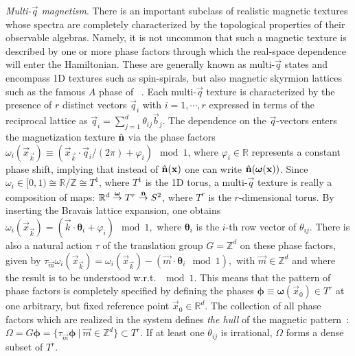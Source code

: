 \documentclass[
    10pt,
    aps,
    prr,
    twocolumn,
    floatfix,
    superscriptaddress
]{revtex4-2}
\newcommand{\revise}[1]{{\color{red} #1}}
\begin{document}
\revise{{\it Multi-$\vec{q}$ magnetism}}. There is an important subclass of realistic magnetic textures whose spectra are completely characterized by the topological properties of their observable algebras.
Namely, it is not uncommon that such a magnetic texture is described by one or more phase factors through which the real-space dependence will enter the Hamiltonian. 
These are generally known as multi-$\vec{q}$ states and encompass 1D textures such as spin-spirals, but also magnetic skyrmion lattices such as the famous $A$ phase of ~\cite{Neubauer2009}.
Each multi-$\vec{q}$ texture is characterized by
the presence of $r$ distinct vectors $\vec{q}_i$ with $i=1,\cdots,r$ expressed in terms of the reciprocal lattice as $\vec{q}_i = \sum_{j=1}^d \theta_{ij} \vec{b}_j$.
The dependence on the $\vec{q}$-vectors enters the magnetization texture $\hat{\mathbf{n}}$ via the
phase factors 
$
    \omega_i (\vec{x}_\vec{k}) \equiv  (\vec{x}_\vec{k}  \cdot \vec{q}_i/ (2\pi) + \varphi_i) \mod 1 
$, where $\varphi_i \in \mathbb{R}$ represents a constant phase shift, implying that instead of $\hat{\mathbf{n}}(\mathbf{x})$  one can write $\hat{\mathbf{n}}( \boldsymbol{\omega} (\mathbf{x}) )$.
Since $\omega_i \in [0,1) \cong \mathbb{R}/ \mathbb{Z} \cong T^1$, where $T^1$ is the 1D torus, a multi-$\vec{q}$ texture is really a composition of maps: $\mathbb{R}^d \overset{\boldsymbol{\omega}}{\rightarrow} T^r
     \overset{\hat{\mathbf{n}}}{\rightarrow} S^2 $, where $T^r$ is the $r$-dimensional torus.
By inserting the Bravais lattice expansion, one obtains
$
    \omega_i (\vec{x}_\vec{k}) = \left(
      \vec{k} \cdot \boldsymbol{\theta}_i
     + \varphi_i
    \right) \mod 1,
$
where $\boldsymbol{\theta}_i$ is the $i$-th row vector of $\theta_{ij}$.
There is also a natural action $\tau$ of the translation group $G=\mathbb{Z}^d$ on these phase factors, given by
$
    \tau_{\vec{m}}\omega_i (\vec{x}_\vec{k}) =\omega_i (\vec{x}_\vec{k} ) - ( \vec{m} \cdot \boldsymbol{\theta}_i \mod 1) ,
$
with $\vec{m}\in \mathbb{Z}^d$ and where the result is to be understood w.r.t. $\mod 1$.
This means that the pattern of phase factors is completely specified by defining the phases  $\boldsymbol{\phi} \equiv \boldsymbol{\omega}(\vec{x}_0) \in T^r$  at one arbitrary, but fixed reference point $\vec{x}_0 \in \mathbb{R}^d$.
The collection of all phase factors which are realized in the system defines {\it the hull} of the magnetic pattern~\cite{Bellissard2000}:
$
    \Omega = G\boldsymbol{\phi}= \lbrace \tau_{\vec{m}}\boldsymbol{\phi} ~|~ \vec{m} \in \mathbb{Z}^d \rbrace  \subset T^r 
$.
If at least one $\theta_{ij}$ is irrational, $\Omega$ forms a dense subset of $T^r$.
\end{document}
